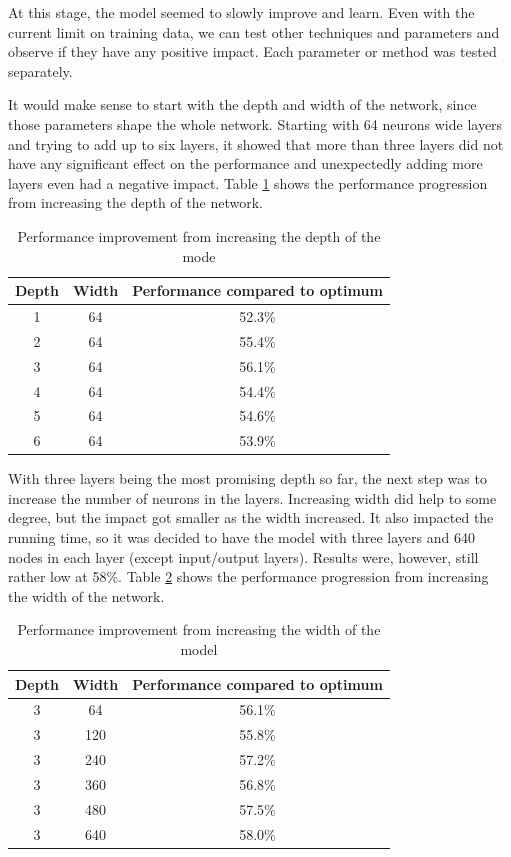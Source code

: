 At this stage, the model seemed to slowly improve and learn. Even with the current limit on training data, we can test other techniques and parameters and observe if they have any positive impact. Each parameter or method was tested separately. 

It would make sense to start with the depth and width of the network, since those parameters shape the whole network. Starting with 64 neurons wide layers and trying to add up to six layers, it showed that more than three layers did not have any significant effect on the performance and unexpectedly adding more layers even had a negative impact. Table \ref{nnsizetable1} shows the performance progression from increasing the depth of the network.

\begin{table}[h!]
\centering
\begin{tabular}{|| c | c | c ||} 
 \hline
 Depth & Width & Performance compared to optimum \\ [0.5ex] 
 \hline\hline
 1 & 64 & 52.3\% \\
 \hline
 2 & 64 & 55.4\% \\
 \hline
 3 & 64 & 56.1\% \\
 \hline
 4 & 64 & 54.4\% \\
 \hline
 5 & 64 & 54.6\% \\
 \hline
 6 & 64 & 53.9\% \\
 \hline
\end{tabular}
\caption{Performance improvement from increasing the depth of the mode}
\label{nnsizetable1}
\end{table}

With three layers being the most promising depth so far, the next step was to increase the number of neurons in the layers. Increasing width did help to some degree, but the impact got smaller as the width increased. It also impacted the running time, so it was decided to have the model with three layers and 640 nodes in each layer (except input/output layers). Results were, however, still rather low at 58\%. Table \ref{nnsizetable2} shows the performance progression from increasing the width of the network.

\begin{table}[h!]
\centering
\begin{tabular}{|| c | c | c ||} 
 \hline
 Depth & Width & Performance compared to optimum \\ [0.5ex] 
 \hline\hline
 3 & 64 & 56.1\% \\
 \hline
 3 & 120 & 55.8\% \\
 \hline
 3 & 240 & 57.2\% \\
 \hline
 3 & 360 & 56.8\% \\
 \hline
 3 & 480 & 57.5\% \\
 \hline
 3 & 640 & 58.0\% \\
 \hline
\end{tabular}
\caption{Performance improvement from increasing the width of the model}
\label{nnsizetable2}
\end{table}

